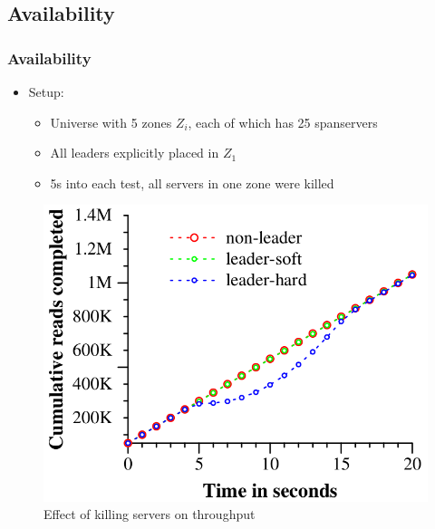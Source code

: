 \documentclass{beamer}
\begin{document}
\subsection{Availability}
\begin{frame}
  \frametitle{Availability}
  \begin{itemize}
    \item{Setup:}
    \begin{itemize}
      \item{Universe with 5 zones $Z_i$, each of which has 25 spanservers}
      \item{All leaders explicitly placed in $Z_1$}
      \item{5s into each test, all servers in one zone were killed}
    \end{itemize}
  \end{itemize}
  \begin{figure}
    \centering
    \includegraphics[width=.5\textwidth]{figures/effect-of-killing-servers-on-throughput.png}
    \caption{Effect of killing servers on throughput}
  \end{figure}
\end{frame}

\end{document}
